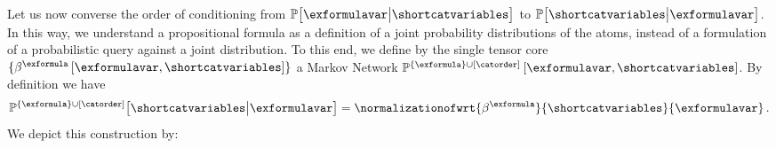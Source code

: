 %	



%		
%


Let us now converse the order of conditioning from $\condprobof{\exformulavar}{\shortcatvariables}$ to $\condprobof{\shortcatvariables}{\exformulavar}$.
In this way, we understand a propositional formula as a definition of a joint probability distributions of the atoms, instead of a formulation of a probabilistic query against a joint distribution.
To this end, we define by the single tensor core $\{\bencodingofat{\exformula}{\exformulavar,\shortcatvariables}\}$ a Markov Network $\probofat{\{\exformula\}\cup[\catorder]}{\exformulavar,\shortcatvariables}$.
By definition we have
\begin{align*}
    \condprobwrtof{\{\exformula\}\cup[\catorder]}{\shortcatvariables}{\exformulavar}
    = \normalizationofwrt{\bencodingof{\exformula}}{\shortcatvariables}{\exformulavar} \, .
\end{align*}
We depict this construction by:
\begin{center}
    
\end{center}


